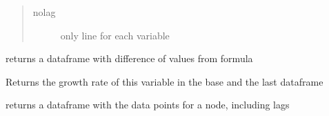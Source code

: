 \documentclass[letterpaper,10pt,english]{sphinxmanual}
\begin{document}
\begin{fulllineitems}
\begin{fulllineitems}
\begin{description}
\begin{quote}
\begin{description}
\item[{nolag}] \leavevmode
\sphinxAtStartPar
only line for each variable

\end{description}\end{quote}

\end{description}

\end{fulllineitems}


\begin{fulllineitems}
\label{\detokenize{index:modelclass.Org_model_Mixin.get_eq_dif}}
\pysigstartsignatures
{}
\pysigstopsignatures
\sphinxAtStartPar
returns a dataframe with difference of values from formula

\end{fulllineitems}


\begin{fulllineitems}
\label{\detokenize{index:modelclass.Org_model_Mixin.get_var_growth}}
\pysigstartsignatures
{}
\pysigstopsignatures
\sphinxAtStartPar
Returns the  growth rate of this variable in the base and the last dataframe

\end{fulllineitems}


\begin{fulllineitems}
\label{\detokenize{index:modelclass.Org_model_Mixin.get_values}}
\pysigstartsignatures
{}
\pysigstopsignatures
\sphinxAtStartPar
returns a dataframe with the data points for a node,  including lags


\end{fulllineitems}
\end{fulllineitems}
\end{document}
